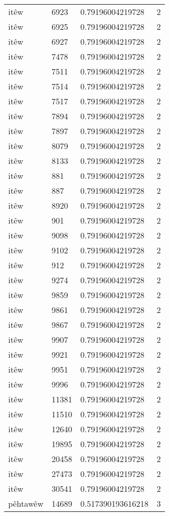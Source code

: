 \begin{longtable}{llll}
itêw & 6923 & 0.79196004219728 & 2\\
itêw & 6925 & 0.79196004219728 & 2\\
itêw & 6927 & 0.79196004219728 & 2\\
itêw & 7478 & 0.79196004219728 & 2\\
itêw & 7511 & 0.79196004219728 & 2\\
itêw & 7514 & 0.79196004219728 & 2\\
itêw & 7517 & 0.79196004219728 & 2\\
itêw & 7894 & 0.79196004219728 & 2\\
itêw & 7897 & 0.79196004219728 & 2\\
itêw & 8079 & 0.79196004219728 & 2\\
itêw & 8133 & 0.79196004219728 & 2\\
itêw & 881 & 0.79196004219728 & 2\\
itêw & 887 & 0.79196004219728 & 2\\
itêw & 8920 & 0.79196004219728 & 2\\
itêw & 901 & 0.79196004219728 & 2\\
itêw & 9098 & 0.79196004219728 & 2\\
itêw & 9102 & 0.79196004219728 & 2\\
itêw & 912 & 0.79196004219728 & 2\\
itêw & 9274 & 0.79196004219728 & 2\\
itêw & 9859 & 0.79196004219728 & 2\\
itêw & 9861 & 0.79196004219728 & 2\\
itêw & 9867 & 0.79196004219728 & 2\\
itêw & 9907 & 0.79196004219728 & 2\\
itêw & 9921 & 0.79196004219728 & 2\\
itêw & 9951 & 0.79196004219728 & 2\\
itêw & 9996 & 0.79196004219728 & 2\\
itêw & 11381 & 0.79196004219728 & 2\\
itêw & 11510 & 0.79196004219728 & 2\\
itêw & 12640 & 0.79196004219728 & 2\\
itêw & 19895 & 0.79196004219728 & 2\\
itêw & 20458 & 0.79196004219728 & 2\\
itêw & 27473 & 0.79196004219728 & 2\\
itêw & 30541 & 0.79196004219728 & 2\\
pêhtawêw & 14689 & 0.517390193616218 & 3\\

\end{longtable}

